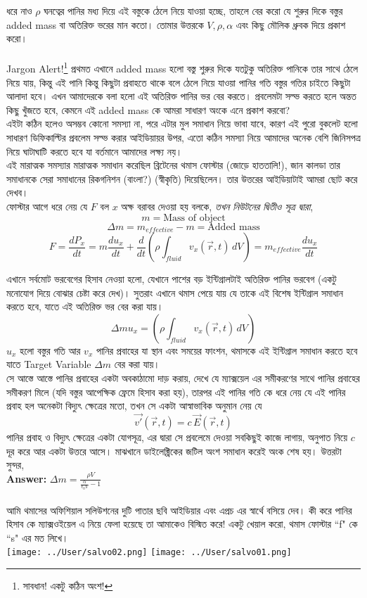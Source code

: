 \documentclass[12pt,a4paper]{article}
\begin{document}
ধরে নাও $\rho$ ঘনত্বের পানির মধ্য দিয়ে এই বস্তুকে ঠেলে নিয়ে যাওয়া হচ্ছে, তাহলে বের করো যে শুরুর দিকে বস্তুর added mass বা অতিরিক্ত ভরের মান কতো। তোমার উত্তরকে $V, \rho, \alpha$ এবং কিছু মৌলিক ধ্রুবক দিয়ে প্রকাশ করো। \\
\\
Jargon Alert!\footnote{সাবধান! একটু কঠিন অংশ!}
প্রথমত এখানে added mass হলো বস্তু শুরুর দিকে যতটুকু অতিরিক্ত পানিকে তার সাথে ঠেলে নিয়ে যায়, কিন্তু এই পানি কিন্তু কিছুটা প্রবাহতে থাকে বলে ঠেলে নিয়ে যাওয়া পানির গতি বস্তুর গতির চাইতে কিছুটা আলাদা হবে। এখন আমাদেরকে বলা হলো এই অতিরিক্ত পানির ভর বের করতে। প্রবলেমটা সল্ভ করতে হলে অন্তত কিছু খুঁজতে হবে, কেমনে এই added mass কে আমরা সাধারণ অংকে এনে প্রকাশ করবো?\\
এইটা কঠিন হলেও অসম্ভব কোনো সমস্যা না, পরে এটার মুল সমাধান নিয়ে ভাবা যাবে, কারণ এই পুরো বুকলেট হলো সাধারণ ডিফিকাল্টির প্রবলেম সল্ভ করার আইডিয়ায়র উপর, এতো কঠিন সমস্যা নিয়ে আমাদের অনেক বেশি জিনিসপত্র নিয়ে ঘাটাঘাটি করতে হবে যা বর্তমানে আমাদের লক্ষ্য নয়। \\
এই মারাত্মক সমস্যার মারাত্মক সমাধান করেছিল ব্রিটেনের থমাস ফোস্টার (জোড়ে হাততালি!), জান কালডা তার সমাধানকে সেরা সমাধানের রিকগনিশন (বাংলা?) (স্বীকৃতি) দিয়েছিলেন। তার উত্তরের আইডিয়াটাই আমরা ছোট করে দেখব।\\
ফোস্টার আগে ধরে নেয় যে $F$ বল $x$ অক্ষ বরাবর দেওয়া হয় বলকে, \textit{তখন নিউটনের দ্বিতীও সূত্র দ্বারা},
\[ m = \text{Mass of object} \]
%
\[ \Delta m = m_{effective} - m = \text{Added mass} \]
%
\[ F = \frac{d P_x}{dt} = m \frac{d u_x}{dt} + \frac{d}{dt} 
\left( \rho \int_{fluid} v_x(\vec{r}, t)\, dV \right) 
=
m_{effective} \frac{d u_x}{dt} \]

এখানে সর্বমোট ভরবেগের হিসাব নেওয়া হলো, যেখানে পাশের বড় ইন্টিগ্রালটাই অতিরিক্ত পানির ভরবেগ (একটু মনোযোগ দিয়ে বোঝার চেষ্টা করে দেখ)। সুতরাং এখানে থমাস পেয়ে যায় যে তাকে এই বিশেষ ইন্টিগ্রাল সমাধান করতে হবে, যাতে এই অতিরিক্ত ভর বের করা যায়। 
\[ \Delta m u_x = \left( \rho \int_{fluid} v_x(\vec{r}, t) \,dV \right) \]
$u_x$ হলো বস্তুর গতি আর $v_x$ পানির প্রবাহের যা স্থান এবং সময়ের ফাংশন, থমাসকে এই ইন্টিগ্রাল সমাধান করতে হবে যাতে Target Variable $\Delta m$ বের করা যায়।\\
সে আস্তে আস্তে পানির প্রবাহের একটা অবকাঠামো দাড় করায়, দেখে যে ম্যাক্সয়েল এর সমীকরণের সাথে পানির প্রবাহের সমীকরণ মিলে (যদি বস্তুর আপেক্ষিক ফ্রেমে হিসাব করা হয়), তারপর এই পানির গতি কে ধরে নেয় যে এই পানির প্রবাহ হল অনেকটা বিদ্যুৎ ক্ষেত্রের মতো, তখন সে একটা আস্বাভাবিক অনুমান নেয় যে 
\[
\vec{v'} (\vec{r} , t) = c \, \vec{E} (\vec{r}, t) \]
পানির প্রবাহ ও বিদ্যুৎ ক্ষেত্রের একটা যোগসূত্র, এর দ্বারা সে প্রবলেমে দেওয়া সবকিছুই কাজে লাগায়, অনুপাত নিয়ে $c$ দূর করে আর একটা উত্তরে আসে। মাঝখানে ডাইলেক্ট্রিকের জটিল অংশ সমাধান করেই অংক শেষ হয়। উত্তরটা সুন্দর, \\
\textbf{Answer:} $ \Delta m = \frac{\rho V}{\frac{\alpha}{\epsilon_0V}-1}$\\
\\
আমি থমাসের অফিশিয়াল সলিউশনের দুটি পাতার ছবি আইডিয়ার এবং এপ্রচ এর স্বার্থে বসিয়ে দেব। কী করে পানির হিসাব কে ম্যাক্সওইয়েল এ নিয়ে ফেলা হয়েছে তা আমাকেও বিস্মিত করে! একটু খেয়াল করো, থমাস ফোস্টার ``f" কে ``s" এর মত লিখে।  \\
%
\texttt{[image: ../User/salvo02.png]} 
\newpage
\texttt{[image: ../User/salvo01.png]} 
%
%
\end{document}
